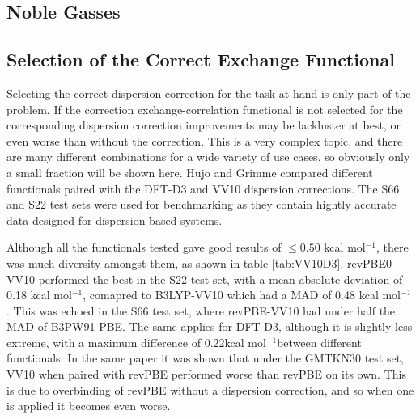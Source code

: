 \documentclass[10pt,a4paper,twocolumn,twoside]{extarticle}
\newcommand{\kcal}{kcal mol\(^{-1}\)}
\begin{document}
	\subsection{Noble Gasses}



	\subsection{Selection of the Correct Exchange Functional}
	Selecting the correct dispersion correction for the task at hand is only part of the problem. If the correction exchange-correlation functional is not selected for the corresponding dispersion correction improvements may be lackluster at best, or even worse than without the correction. This is a very complex topic, and there are many different combinations for a wide variety of use cases, so obviously only a small fraction will be shown here. 
	Hujo and Grimme compared different functionals paired with the DFT-D3 and VV10 dispersion corrections.\cite{Grimme2011-D3-VV10-Compairons} The S66\cite{s66a,s66b} and S22\cite{s22} test sets were used for benchmarking as they contain hightly accurate data designed for dispersion based systems. 

	Although all the functionals tested gave good results of $\leq 0.50$ \kcal, there was much diversity amongst them, as shown in table \ref{tab:VV10D3}. revPBE0-VV10 performed the best in the S22 test set, with a mean absolute deviation of 0.18 \kcal, comapred to B3LYP-VV10 which had a MAD of 0.48 \kcal. This was echoed in the S66 test set, where revPBE-VV10 had under half the MAD of B3PW91-PBE. The same applies for DFT-D3, although it is slightly less extreme, with a maximum difference of 0.22\kcal between different functionals. 
	In the same paper it was shown that under the GMTKN30 test set, VV10 when paired with revPBE performed worse than revPBE on its own. This is due to overbinding of revPBE without a dispersion correction, and so when one is applied it becomes even worse. 

	\begin{figure*}
		\label{tab:VV10D3}
		\centering
		\begin{tabular}[]{c|c c c c}
		\end{tabular}
	\end{figure*}

\end{document}
